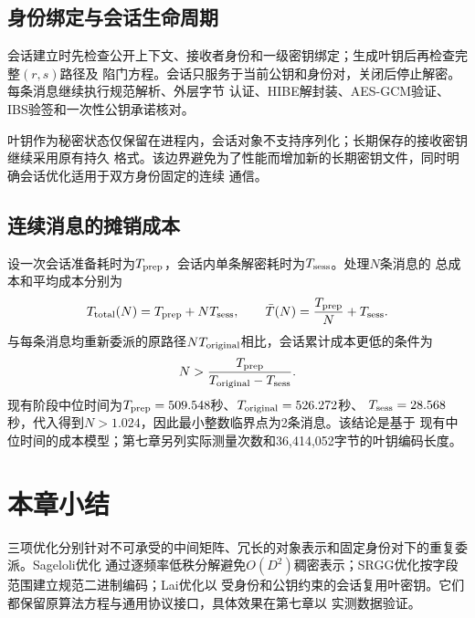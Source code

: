 \subsection{身份绑定与会话生命周期}

会话建立时先检查公开上下文、接收者身份和一级密钥绑定；生成叶钥后再检查完整$(r,s)$路径及
陷门方程。会话只服务于当前公钥和身份对，关闭后停止解密。每条消息继续执行规范解析、外层字节
认证、HIBE解封装、AES-GCM验证、IBS验签和一次性公钥承诺核对。

叶钥作为秘密状态仅保留在进程内，会话对象不支持序列化；长期保存的接收密钥继续采用原有持久
格式。该边界避免为了性能而增加新的长期密钥文件，同时明确会话优化适用于双方身份固定的连续
通信。

\subsection{连续消息的摊销成本}

设一次会话准备耗时为$T_{\rm prep}$，会话内单条解密耗时为$T_{\rm sess}$。处理$N$条消息的
总成本和平均成本分别为
\[
 T_{\rm total}(N)=T_{\rm prep}+NT_{\rm sess},\qquad
 \bar T(N)=\frac{T_{\rm prep}}{N}+T_{\rm sess}.
\]
与每条消息均重新委派的原路径$NT_{\rm original}$相比，会话累计成本更低的条件为
\[
 N>\frac{T_{\rm prep}}{T_{\rm original}-T_{\rm sess}}.
\]
现有阶段中位时间为$T_{\rm prep}=509.548$秒、$T_{\rm original}=526.272$秒、
$T_{\rm sess}=28.568$秒，代入得到$N>1.024$，因此最小整数临界点为2条消息。该结论是基于
现有中位时间的成本模型；第七章另列实际测量次数和36,414,052字节的叶钥编码长度。

\section{本章小结}

三项优化分别针对不可承受的中间矩阵、冗长的对象表示和固定身份对下的重复委派。Sageloli优化
通过逐频率低秩分解避免$O(D^2)$稠密表示；SRGG优化按字段范围建立规范二进制编码；Lai优化以
受身份和公钥约束的会话复用叶密钥。它们都保留原算法方程与通用协议接口，具体效果在第七章以
实测数据验证。
